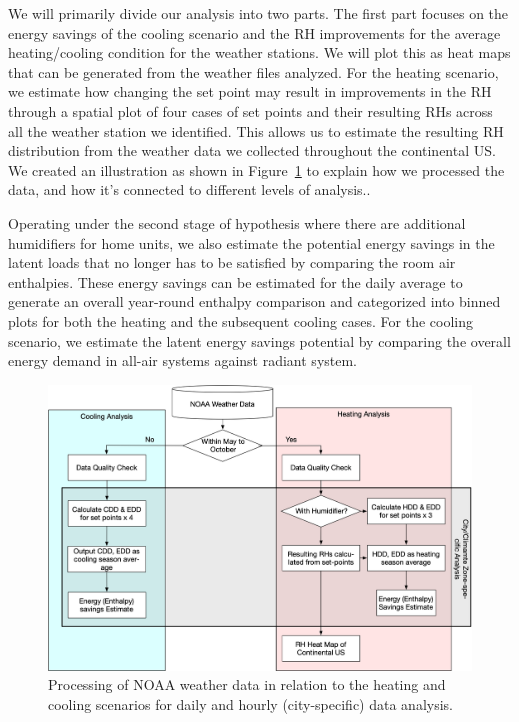 We will primarily divide our analysis into two parts. The first part focuses on the energy savings of the cooling scenario and the RH improvements for the average heating/cooling condition for the weather stations. We will plot this as heat maps that can be generated from the weather files analyzed. 
For the heating scenario, we estimate how changing the set point may result in improvements in the RH through a spatial plot of four cases of set points and their resulting RHs across all the weather station we identified. This allows us to estimate the resulting RH distribution from the weather data we collected throughout the continental US. We created an illustration as shown in Figure~\ref{fg:process} to explain how we processed the data, and how it's connected to different levels of analysis.. %

Operating under the second stage of hypothesis where there are additional humidifiers for home units, we also estimate the potential energy savings in the latent loads that no longer has to be satisfied by comparing the room air enthalpies. These energy savings can be estimated for the daily average to generate an overall year-round enthalpy comparison and categorized into binned plots for both the heating and the subsequent cooling cases. 
For the cooling scenario, we estimate the latent energy savings potential by comparing the overall energy demand in all-air systems against radiant system. 

\begin{figure}[h!]
\includegraphics[width=\textwidth]{diagram_radhum}
\caption{Processing of NOAA weather data in relation to the heating and cooling scenarios for daily and hourly (city-specific) data analysis.}\label{fg:process}
\end{figure}

